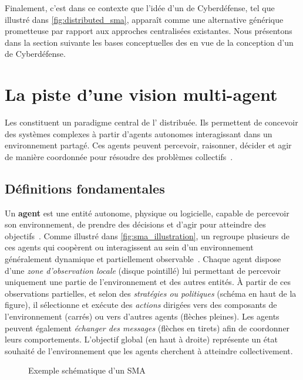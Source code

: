 \noindent
Finalement, c'est dans ce contexte que l'idée d'un  de Cyberdéfense, tel que illustré dans \autoref{fig:distributed_sma}, apparaît comme une alternative générique prometteuse par rapport aux approches centralisées existantes. Nous présentons dans la section suivante les bases conceptuelles des  en vue de la conception d'un  de Cyberdéfense.

\section{La piste d'une vision multi-agent}\label{sec:sma-concepts}

Les  constituent un paradigme central de l' distribuée. Ils permettent de concevoir des systèmes complexes à partir d'agents autonomes interagissant dans un environnement partagé. Ces agents peuvent percevoir, raisonner, décider et agir de manière coordonnée pour résoudre des problèmes collectifs~\cite{Ferber1999,Wooldridge2002}.

\subsection*{Définitions fondamentales}

Un \textbf{agent} est une entité autonome, physique ou logicielle, capable de percevoir son environnement, de prendre des décisions et d'agir pour atteindre des objectifs~\cite{Russell2010}. Comme illustré dans \autoref{fig:sma_illustration}, un  regroupe plusieurs de ces agents qui coopèrent ou interagissent au sein d’un environnement généralement dynamique et partiellement observable~\cite{Jennings1998,Shoham2007}. Chaque agent dispose d’une \emph{zone d’observation locale} (disque pointillé) lui permettant de percevoir uniquement une partie de l’environnement et des autres entités. À partir de ces observations partielles, et selon des \emph{stratégies ou politiques} (schéma en haut de la figure), il sélectionne et exécute des \emph{actions} dirigées vers des composants de l’environnement (carrés) ou vers d’autres agents (flèches pleines). Les agents peuvent également \emph{échanger des messages} (flèches en tirets) afin de coordonner leurs comportements. L’objectif global (en haut à droite) représente un état souhaité de l’environnement que les agents cherchent à atteindre collectivement.

\begin{figure}[h]
  \centering
  \resizebox{\textwidth}{!}{%
    
  }
  \caption{Exemple schématique d'un SMA}
  \label{fig:sma_illustration}
\end{figure}

